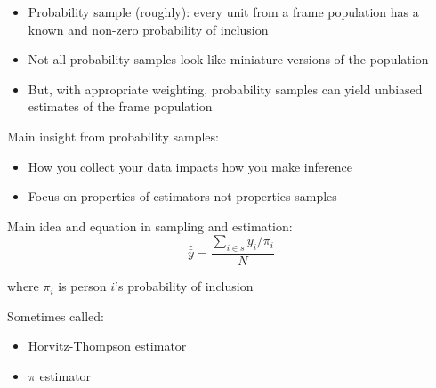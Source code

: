 \documentclass[aspectratio=169]{beamer}
\begin{document}
\begin{frame}

\begin{itemize}
\item Probability sample (roughly): every unit from a frame population has a known and non-zero probability of inclusion
\pause
\item Not all probability samples look like miniature versions of the population
\pause
\item But, with appropriate weighting, probability samples can yield unbiased estimates of the frame population
\end{itemize}

\end{frame}
\begin{frame}

Main insight from probability samples:\\
\begin{itemize}
\item How you collect your data impacts how you make inference
\item Focus on properties of estimators not properties samples
\end{itemize}

\end{frame}
\begin{frame}

Main idea and equation in sampling and estimation:
\begin{equation*}
\hat{\bar{y}} = \frac{\sum_{i \in s} y_i / \pi_i }{N}
\end{equation*}

where $\pi_i$ is person $i$'s probability of inclusion

\vfill

Sometimes called:
\begin{itemize}
\item Horvitz-Thompson estimator
\item $\pi$ estimator
\end{itemize}

\end{frame}
\end{document}
